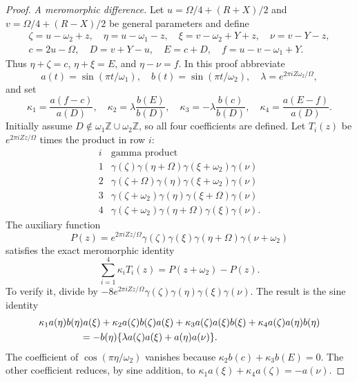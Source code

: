 \documentclass[11pt]{article}
\numberwithin{equation}{section}
\theoremstyle{definition}
\theoremstyle{remark}
\newcommand{\Z}{\mathbb Z}
\begin{document}
\begin{proof}
\emph{A meromorphic difference.}
Let $u=\Omega/4+(R+X)/2$ and
$v=\Omega/4+(R-X)/2$ be general parameters and define
\begin{gather*}
 \zeta=u-\omega_2+z,\quad \eta=u-\omega_1-z,\quad
 \xi=v-\omega_2+Y+z,\quad \nu=v-Y-z,\\
 c=2u-\Omega,\quad D=v+Y-u,\quad E=c+D,\quad
 f=u-v-\omega_1+Y.
\end{gather*}
Thus $\eta+\zeta=c$, $\eta+\xi=E$, and $\eta-\nu=f$.
In this proof abbreviate
\[
 a(t)=\sin(\pi t/\omega_1),\quad b(t)=\sin(\pi t/\omega_2),\quad
 \lambda=e^{2\pi iZ\omega_2/\Omega},
\]
and set
\[
 \kappa_1=\frac{a(f-c)}{a(D)},\quad
 \kappa_2=\lambda\frac{b(E)}{b(D)},\quad
 \kappa_3=-\lambda\frac{b(c)}{b(D)},\quad
 \kappa_4=\frac{a(E-f)}{a(D)}.
\]
Initially assume $D\notin\omega_1\Z\cup\omega_2\Z$, so all four
coefficients are defined.
Let $T_i(z)$ be $e^{2\pi iZz/\Omega}$ times the product in row $i$:
\[
\begin{array}{c|l}
 i&\text{gamma product}\\\hline
 1&\gamma(\zeta)\gamma(\eta+\Omega)\gamma(\xi+\omega_2)\gamma(\nu)\\
 2&\gamma(\zeta+\Omega)\gamma(\eta)\gamma(\xi+\omega_2)\gamma(\nu)\\
 3&\gamma(\zeta+\omega_2)\gamma(\eta)\gamma(\xi+\Omega)\gamma(\nu)\\
 4&\gamma(\zeta+\omega_2)\gamma(\eta+\Omega)\gamma(\xi)\gamma(\nu).
\end{array}
\]
The auxiliary function
\[
 P(z)=e^{2\pi iZz/\Omega}
       \gamma(\zeta)\gamma(\xi)\gamma(\eta+\Omega)\gamma(\nu+\omega_2)
\]
satisfies the exact meromorphic identity
\begin{equation}
 \sum_{i=1}^4\kappa_iT_i(z)=P(z+\omega_2)-P(z).
 \label{an:primitive}
\end{equation}
To verify it, divide by
$-8e^{2\pi iZz/\Omega}\gamma(\zeta)\gamma(\eta)
\gamma(\xi)\gamma(\nu)$.  The result is the sine identity
\begin{align*}
 &\kappa_1a(\eta)b(\eta)a(\xi)
 +\kappa_2a(\zeta)b(\zeta)a(\xi)
 +\kappa_3a(\zeta)a(\xi)b(\xi)
 +\kappa_4a(\zeta)a(\eta)b(\eta)\\
 &\hspace{15mm}=-b(\eta)
             \{\lambda a(\zeta)a(\xi)+a(\eta)a(\nu)\}.
\end{align*}
The coefficient of $\cos(\pi\eta/\omega_2)$ vanishes because
$\kappa_2b(c)+\kappa_3b(E)=0$.  The other coefficient reduces,
by sine addition, to
$\kappa_1a(\xi)+\kappa_4a(\zeta)=-a(\nu)$.


\end{proof}
\end{document}
